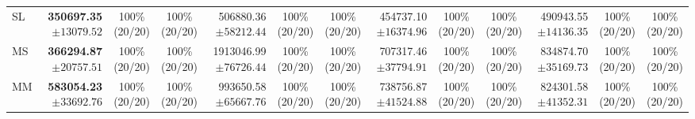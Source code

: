 \documentclass[10pt]{article}
\begin{document}
\begin{table}[!htbp]
\begin{tabular}{@{}l*{4}{rcc}@{}}
SL & \shortstack[r]{\textbf{350697.35}\\$\pm 13079.52$} & \shortstack[c]{100\%\\(20/20)} & \shortstack[c]{100\%\\(20/20)} & \shortstack[r]{506880.36\\$\pm 58212.44$} & \shortstack[c]{100\%\\(20/20)} & \shortstack[c]{100\%\\(20/20)} & \shortstack[r]{454737.10\\$\pm 16374.96$} & \shortstack[c]{100\%\\(20/20)} & \shortstack[c]{100\%\\(20/20)} & \shortstack[r]{490943.55\\$\pm 14136.35$} & \shortstack[c]{100\%\\(20/20)} & \shortstack[c]{100\%\\(20/20)} \\
MS & \shortstack[r]{\textbf{366294.87}\\$\pm 20757.51$} & \shortstack[c]{100\%\\(20/20)} & \shortstack[c]{100\%\\(20/20)} & \shortstack[r]{1913046.99\\$\pm 76726.44$} & \shortstack[c]{100\%\\(20/20)} & \shortstack[c]{100\%\\(20/20)} & \shortstack[r]{707317.46\\$\pm 37794.91$} & \shortstack[c]{100\%\\(20/20)} & \shortstack[c]{100\%\\(20/20)} & \shortstack[r]{834874.70\\$\pm 35169.73$} & \shortstack[c]{100\%\\(20/20)} & \shortstack[c]{100\%\\(20/20)} \\
MM & \shortstack[r]{\textbf{583054.23}\\$\pm 33692.76$} & \shortstack[c]{100\%\\(20/20)} & \shortstack[c]{100\%\\(20/20)} & \shortstack[r]{993650.58\\$\pm 65667.76$} & \shortstack[c]{100\%\\(20/20)} & \shortstack[c]{100\%\\(20/20)} & \shortstack[r]{738756.87\\$\pm 41524.88$} & \shortstack[c]{100\%\\(20/20)} & \shortstack[c]{100\%\\(20/20)} & \shortstack[r]{824301.58\\$\pm 41352.31$} & \shortstack[c]{100\%\\(20/20)} & \shortstack[c]{100\%\\(20/20)} \\

\end{tabular}
\end{table}
\end{document}
